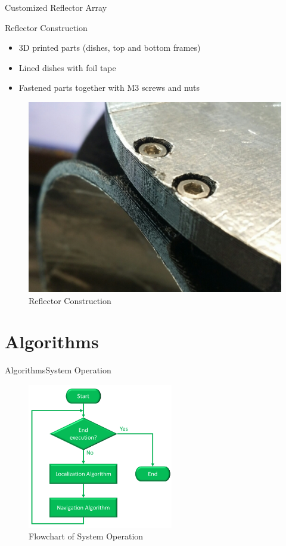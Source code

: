 \documentclass{beamer}
\begin{document}
\begin{frame}{Customized Reflector Array}
  \begin{block}{Reflector Construction}
    \begin{itemize}
      \item 3D printed parts (dishes, top and bottom frames)
      \item Lined dishes with foil tape
      \item Fastened parts together with M3 screws and nuts
    \end{itemize}
  \end{block}
  \begin{figure}
    \centering
    \includegraphics[height=0.5\textheight]{figs/img/reflectorConstruction.jpg}
    \caption{Reflector Construction}
  \end{figure}
\end{frame}


\section{Algorithms}

\begin{frame}{Algorithms}{System Operation}
  \begin{figure}
    \centering
    \includegraphics[height=2.5in]{figs/systemOperationFlowchart.pdf}
    \caption{Flowchart of System Operation}
  \end{figure}
\end{frame}
\end{document}
